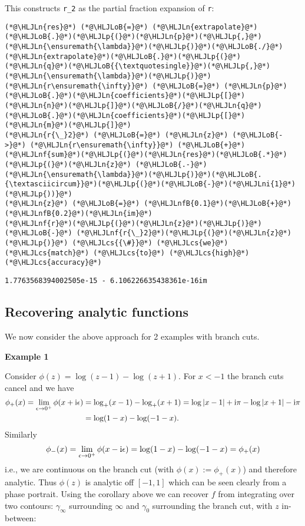 \documentclass[12pt,landscape]{article}
\newcommand{\HLJLn}[1]{#1}
\newcommand{\HLJLnf}[1]{\textcolor[RGB]{66,102,213}{#1}}
\newcommand{\HLJLnfB}[1]{\textcolor[RGB]{59,151,46}{#1}}
\newcommand{\HLJLni}[1]{\textcolor[RGB]{59,151,46}{#1}}
\newcommand{\HLJLoB}[1]{\textcolor[RGB]{102,102,102}{\textbf{#1}}}
\newcommand{\HLJLp}[1]{#1}
\newcommand{\HLJLcs}[1]{\textcolor[RGB]{153,153,119}{\textit{#1}}}
\def\I{ {\rm i} }
\begin{document}
{This constructs \texttt{r\_2} as the partial fraction expansion of \texttt{r}:
\begin{lstlisting}
(*@\HLJLn{res}@*) (*@\HLJLoB{=}@*) (*@\HLJLn{extrapolate}@*)(*@\HLJLoB{.}@*)(*@\HLJLp{(}@*)(*@\HLJLn{p}@*)(*@\HLJLp{,}@*)(*@\HLJLn{\ensuremath{\lambda}}@*)(*@\HLJLp{)}@*)(*@\HLJLoB{./}@*)(*@\HLJLn{extrapolate}@*)(*@\HLJLoB{.}@*)(*@\HLJLp{(}@*)(*@\HLJLn{q}@*)(*@\HLJLoB{{\textquotesingle}}@*)(*@\HLJLp{,}@*)(*@\HLJLn{\ensuremath{\lambda}}@*)(*@\HLJLp{)}@*)
(*@\HLJLn{r\ensuremath{\infty}}@*) (*@\HLJLoB{=}@*) (*@\HLJLn{p}@*)(*@\HLJLoB{.}@*)(*@\HLJLn{coefficients}@*)(*@\HLJLp{[}@*)(*@\HLJLn{n}@*)(*@\HLJLp{]}@*)(*@\HLJLoB{/}@*)(*@\HLJLn{q}@*)(*@\HLJLoB{.}@*)(*@\HLJLn{coefficients}@*)(*@\HLJLp{[}@*)(*@\HLJLn{m}@*)(*@\HLJLp{]}@*)
(*@\HLJLn{r{\_}2}@*) (*@\HLJLoB{=}@*) (*@\HLJLn{z}@*) (*@\HLJLoB{->}@*) (*@\HLJLn{r\ensuremath{\infty}}@*) (*@\HLJLoB{+}@*) (*@\HLJLnf{sum}@*)(*@\HLJLp{(}@*)(*@\HLJLn{res}@*)(*@\HLJLoB{.*}@*)(*@\HLJLp{(}@*)(*@\HLJLn{z}@*) (*@\HLJLoB{.-}@*) (*@\HLJLn{\ensuremath{\lambda}}@*)(*@\HLJLp{)}@*)(*@\HLJLoB{.{\textasciicircum}}@*)(*@\HLJLp{(}@*)(*@\HLJLoB{-}@*)(*@\HLJLni{1}@*)(*@\HLJLp{))}@*)
(*@\HLJLn{z}@*) (*@\HLJLoB{=}@*) (*@\HLJLnfB{0.1}@*)(*@\HLJLoB{+}@*)(*@\HLJLnfB{0.2}@*)(*@\HLJLn{im}@*)
(*@\HLJLnf{r}@*)(*@\HLJLp{(}@*)(*@\HLJLn{z}@*)(*@\HLJLp{)}@*) (*@\HLJLoB{-}@*) (*@\HLJLnf{r{\_}2}@*)(*@\HLJLp{(}@*)(*@\HLJLn{z}@*)(*@\HLJLp{)}@*) (*@\HLJLcs{{\#}}@*) (*@\HLJLcs{we}@*) (*@\HLJLcs{match}@*) (*@\HLJLcs{to}@*) (*@\HLJLcs{high}@*) (*@\HLJLcs{accuracy}@*)
\end{lstlisting}
\begin{lstlisting}
1.7763568394002505e-15 - 6.106226635438361e-16im
\end{lstlisting}


\subsection{Recovering analytic functions}
We now consider the above approach for 2 examples with branch cuts.

\textbf{Example 1}

Consider $\phi(z) = \log(z-1) - \log(z+1)$. For $x < -1$ the branch cuts cancel and we have
\begin{align*}
\phi_+(x) = \lim_{\epsilon \to 0^+} \phi(x + \I \epsilon)& = \log_+(x-1) - \log_+(x+1) =
\log|x-1| + \I \pi - \log|x+1| - \I \pi\\
& = \log(1-x) - \log(-1-x).
\end{align*}
Similarly
\[
\phi_-(x) = \lim_{\epsilon \to 0^+} \phi(x -  \I \epsilon) =  \log(1-x) - \log(-1-x) = \phi_+(x)
\]
i.e., we are continuous on the branch cut (with $\phi(x) := \phi_+(x)$) and therefore analytic. Thus $\phi(z)$ is analytic off $[-1,1]$ which can be seen clearly from a phase portrait. Using the corollary above we can recover $f$ from integrating over two contours: $\gamma_\infty$ surrounding $\infty$ and $\gamma_0$ surrounding the branch cut, with $z$ in-between:


}
\end{document}
